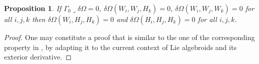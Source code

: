 \documentclass[11pt]{article}
\theoremstyle{plain}
\newtheorem{proposition}{Proposition}
\theoremstyle{definition}
\newcommand{\iprod}{\mathbin{\lrcorner}} %
\begin{document}
\begin{proposition}\label{prop:redundant}
If $\Gamma_0\iprod \delta \Omega=0$, $\delta\Omega(W_i,W_j,H_k)=0$, $\delta \Omega(W_i,W_j,W_k)=0$ for all $i,j,k$ then $\delta \Omega(W_i,H_j,H_k)=0$ and $\delta {\Omega}(H_i,H_j,H_k)=0$ for all $i,j,k$.
\end{proposition}

\begin{proof}
One may constitute a proof that is similar to the one of the corresponding property in  \cite{do2016invprob}, by adapting it to the current context of Lie algebroids and its exterior derivative.
 \end{proof}


\end{document}
